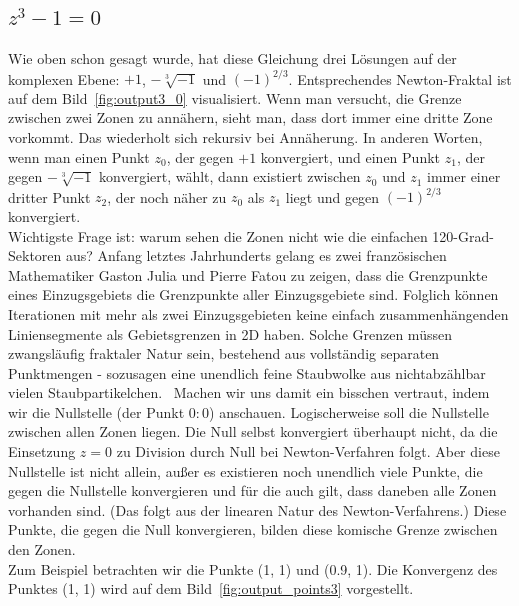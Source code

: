 \documentclass[a4paper,12pt]{llncs}
\numberwithin{equation}{section}
\begin{document}
\subsection{$z^3 - 1 = 0$}
Wie oben schon gesagt wurde, hat diese Gleichung drei Lösungen auf der komplexen Ebene: $+1$, $-\sqrt[3]{-1}$ und $(-1)^{2/3}$. Entsprechendes Newton-Fraktal ist auf dem Bild~\ref{fig:output3_0} visualisiert. 
Wenn man versucht, die Grenze zwischen zwei Zonen zu annähern, sieht man, dass dort immer eine dritte Zone vorkommt. 
Das wiederholt sich rekursiv bei Annäherung.
In anderen Worten, wenn man einen Punkt $z_0$, der gegen $+1$ konvergiert, und einen Punkt $z_1$, der gegen  $-\sqrt[3]{-1}$ konvergiert, wählt, dann existiert zwischen $z_0$ und $z_1$ immer einer dritter Punkt $z_2$, der noch näher zu $z_0$ als $z_1$ liegt und gegen $(-1)^{2/3}$ konvergiert. \\
Wichtigste Frage ist: warum sehen die Zonen nicht wie die einfachen 120-Grad-Sektoren aus?
Anfang letztes Jahrhunderts gelang es zwei französischen Mathematiker Gaston Julia und Pierre Fatou zu zeigen, dass die Grenzpunkte eines Einzugsgebiets die Grenzpunkte aller Einzugsgebiete sind. 
Folglich können Iterationen mit mehr als zwei Einzugsgebieten keine einfach zusammenhängenden Liniensegmente als Gebietsgrenzen in 2D haben. 
Solche Grenzen müssen zwangsläufig fraktaler Natur sein, bestehend aus vollständig separaten Punktmengen - sozusagen eine unendlich feine Staubwolke aus nichtabzählbar vielen Staubpartikelchen.~\cite{frak_cha}
Machen wir uns damit ein bisschen vertraut, indem wir die Nullstelle (der Punkt $0:0$) anschauen.
Logischerweise soll die Nullstelle zwischen allen Zonen liegen.
Die Null selbst konvergiert überhaupt nicht, da die Einsetzung $z=0$ zu Division durch Null bei Newton-Verfahren folgt.
Aber diese Nullstelle ist nicht allein, außer es existieren noch unendlich viele Punkte, die gegen die Nullstelle konvergieren und für die auch gilt, dass daneben alle Zonen vorhanden sind.
(Das folgt aus der linearen Natur des Newton-Verfahrens.)
Diese Punkte, die gegen die Null konvergieren, bilden diese komische Grenze zwischen den Zonen.\\
Zum Beispiel betrachten wir die Punkte (1, 1) und (0.9, 1). 
Die Konvergenz des Punktes (1, 1) wird auf dem Bild~\ref{fig:output_points3} vorgestellt.\\
\end{document}
